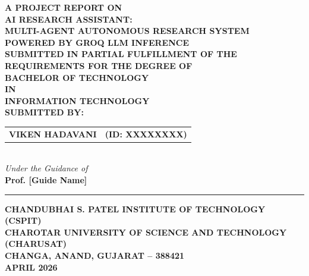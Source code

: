 \documentclass[a4paper,12pt,openany]{report}
\renewcommand{\headrulewidth}{0.4pt}
\renewcommand{\footrulewidth}{0.4pt}
\renewcommand{\headrulewidth}{0.4pt}
\renewcommand{\footrulewidth}{0.4pt}
\renewcommand{\headrulewidth}{0pt}%
\renewcommand{\footrulewidth}{0pt}%
\begin{document}
\begin{titlepage}
\begin{center}
\vspace*{0.5cm}
{\fontsize{14}{17}\selectfont \textbf{A PROJECT REPORT ON}}\\[0.8cm]
{\fontsize{16}{19}\selectfont \textbf{AI RESEARCH ASSISTANT:\\MULTI-AGENT AUTONOMOUS RESEARCH SYSTEM\\POWERED BY GROQ LLM INFERENCE}}\\[1.5cm]
{\fontsize{12}{14}\selectfont \textbf{SUBMITTED IN PARTIAL FULFILLMENT OF THE\\REQUIREMENTS FOR THE DEGREE OF}}\\[0.6cm]
{\fontsize{14}{17}\selectfont \textbf{BACHELOR OF TECHNOLOGY}}\\[0.3cm]
{\fontsize{12}{14}\selectfont \textbf{IN}}\\[0.3cm]
{\fontsize{14}{17}\selectfont \textbf{INFORMATION TECHNOLOGY}}\\[1.5cm]
{\fontsize{12}{14}\selectfont \textbf{SUBMITTED BY:}}\\[0.4cm]
{\fontsize{12}{14}\selectfont
\begin{tabular}{ll}
\textbf{VIKEN HADAVANI} & \textbf{(ID: XXXXXXXX)}\\
\end{tabular}}\\[1.2cm]
{\fontsize{12}{14}\selectfont \textit{Under the Guidance of}}\\[0.3cm]
{\fontsize{12}{14}\selectfont \textbf{Prof. [Guide Name]}}\\[1.5cm]
\vspace{0.5cm}
\rule{2.5cm}{2.5cm} %
\vspace{0.5cm}
\vspace{0.3cm}
{\fontsize{12}{14}\selectfont \textbf{CHANDUBHAI S. PATEL INSTITUTE OF TECHNOLOGY (CSPIT)\\CHAROTAR UNIVERSITY OF SCIENCE AND TECHNOLOGY (CHARUSAT)\\CHANGA, ANAND, GUJARAT -- 388421}}\\[0.8cm]
{\fontsize{12}{14}\selectfont \textbf{APRIL 2026}}
\end{center}
\end{titlepage}

\pagestyle{empty}
\fancypagestyle{plain}{\fancyhf{}\renewcommand{\headrulewidth}{0pt}\renewcommand{\footrulewidth}{0pt}}
\end{document}
